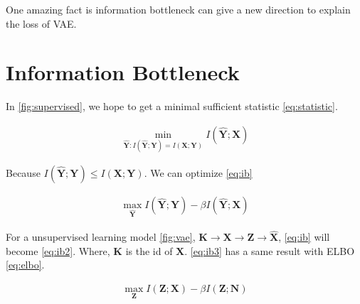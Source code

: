 \documentclass{article}
\begin{document}
One amazing fact is information bottleneck can give a new direction to explain
the loss of VAE.\cite{alemi2016deep}

\section{Information Bottleneck}

In \cref{fig:supervised}, we hope to get a minimal sufficient statistic
\cref{eq:statistic}.

\begin{align}
  \label{eq:statistic}
  \min_{\hat{\bm{Y}}: I(\hat{\bm{Y}}; \bm{Y}) = I(\bm{X}; \bm{Y})} I(\hat{\bm{Y}}; \bm{X})
\end{align}

Because $I(\hat{\bm{Y}}; \bm{Y}) \leqslant I(\bm{X}; \bm{Y})$. We can optimize
\cref{eq:ib}

\begin{align}
  \label{eq:ib}
  \max_{\hat{\bm{Y}}} I(\hat{\bm{Y}}; \bm{Y}) - \beta I(\hat{\bm{Y}}; \bm{X})
\end{align}

For a unsupervised learning model \cref{fig:vae}, $\bm{K} \rightarrow \bm{X} \rightarrow \bm{Z}
\rightarrow \hat{\bm{X}}$, \cref{eq:ib} will become \cref{eq:ib2}. Where,
$\bm{K}$ is the id of $\bm{X}$. \cref{eq:ib3} has a same result with ELBO
\cref{eq:elbo}.

\begin{align}
  \label{eq:ib2}
  \max_{\bm{Z}} I(\bm{Z}; \bm{X}) - \beta I(\bm{Z}; \bm{N})
\end{align}
\end{document}
